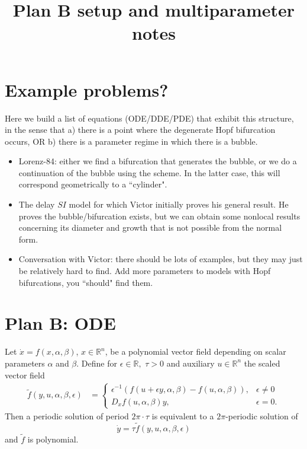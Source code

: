 \documentclass[10pt]{article}
\newcommand{\R}{\mathbb{R}}
\begin{document}
\title{Plan B setup and multiparameter notes}
\maketitle

\section{Example problems?}
Here we build a list of equations (ODE/DDE/PDE) that exhibit this structure, in the sense that a) there is a point where the degenerate Hopf bifurcation occurs, OR b) there is a parameter regime in which there is a bubble.
\begin{itemize}
\item Lorenz-84: either we find a bifurcation that generates the bubble, or we do a continuation of the bubble using the scheme. In the latter case, this will correspond geometrically to a ``cylinder".
\item The delay $SI$ model for which Victor initially proves his general result. He proves the bubble/bifurcation exists, but we can obtain some nonlocal results concerning its diameter and growth that is not possible from the normal form.
\item Conversation with Victor: there should be lots of examples, but they may just be relatively hard to find. Add more parameters to models with Hopf bifurcations, you ``should" find them.
\end{itemize}
\section{Plan B: ODE}
Let $\dot x=f(x,\alpha,\beta)$, $x\in\R^n$, be a polynomial vector field depending on scalar parameters $\alpha$ and $\beta$. Define for $\epsilon\in\R,$ $\tau>0$ and auxiliary $u\in\R^n$ the scaled vector field
\begin{align*}
\tilde f(y,u,\alpha,\beta,\epsilon)&=\left\{\begin{array}{ll}
\epsilon^{-1}(f(u+\epsilon y,\alpha,\beta)-f(u,\alpha,\beta)),&\epsilon\neq 0\\
D_xf(u,\alpha,\beta)y,&\epsilon=0.\end{array}\right.
\end{align*}
Then a periodic solution of period $2\pi\cdot\tau$ is equivalent to a $2\pi$-periodic solution of
$$\dot y = \tau\tilde f(y,u,\alpha,\beta,\epsilon)$$
and $\tilde f$ is polynomial.
\end{document}
